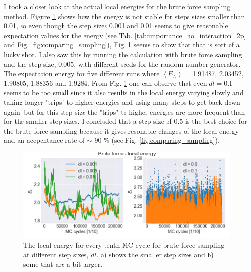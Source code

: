 I took a closer look at the actual local energies for the brute force sampling method. Figure \ref{fig:local_energy_step_size_brute_force} shows how the energy is not stable for steps sizes smaller than 0.01, so even though the step sizes 0.001 and 0.01 seems to give reasonable expectation values for the energy (see Tab. \ref{tab:importance_no_interaction_2p} and Fig. \ref{fig:comparing_sampling}), Fig. \ref{fig:local_energy_step_size_brute_force} seems to show that that is sort of a lucky shot. I also saw this by running the calculation with brute force sampling and the step size, $0.005$, with different seeds for the random number generator. The expectation energy for five different runs where $\left< E_L \right>$ =  1.91487, 2.03452, 1.90805, 1.88356 and 1.9284. From Fig. \ref{fig:local_energy_step_size_brute_force} one can observe that even $dl=0.1$ seems to be too small since it also results in the local energy varying slowly and taking longer "trips" to higher energies and using many steps to get back down again, but for this step size the "trips" to higher energies are more frequent than for the smaller step sizes. I concluded that a step size of 0.5 is the best choice for the brute force sampling because it gives resonable changes of the local energy and an accpentance rate of $\sim$ 90 \% (see Fig. \ref{fig:comparing_sampling}). 

\begin{figure}[H]
\center
\includegraphics[width=0.85\linewidth]{../Results/local_energy_step_sizes}\caption{The local energy for every tenth MC cycle for brute force sampling at different step sizes, $dl$. a) shows the smaller step sizes and b) some that are a bit larger.}\label{fig:local_energy_step_size_brute_force}
\end{figure}

%

